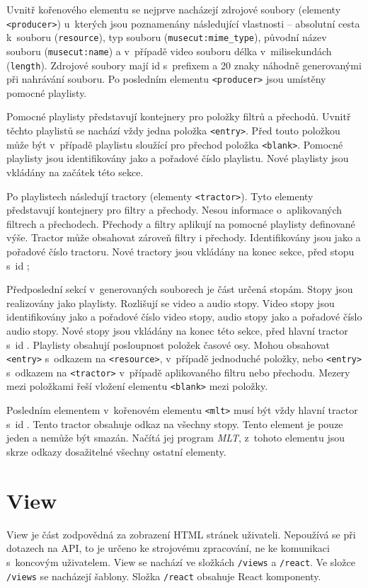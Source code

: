 Uvnitř kořenového elementu se nejprve nacházejí zdrojové soubory (elementy \texttt{<producer>}) u~kterých jsou poznamenány následující vlastnosti -- absolutní cesta k~souboru (\texttt{resource}), typ souboru (\texttt{musecut:mime\_type}), původní název souboru (\texttt{musecut:name}) a v~případě video souboru délka v~milisekundách (\texttt{length}). Zdrojové soubory mají id s~prefixem  a 20 znaky náhodně generovanými při nahrávání souboru.
Po posledním elementu \texttt{<producer>} jsou umístěny pomocné playlisty.

Pomocné playlisty představují kontejnery pro položky filtrů a přechodů. Uvnitř těchto playlistů se nachází vždy jedna položka \texttt{<entry>}. Před touto položkou může být v~případě playlistu sloužící pro přechod položka \texttt{<blank>}. Pomocné playlisty jsou identifikovány jako  a pořadové číslo playlistu. Nové playlisty jsou vkládány na začátek této sekce.

Po playlistech následují tractory (elementy \texttt{<tractor>}). Tyto elementy představují kontejnery pro filtry a přechody. Nesou informace o~aplikovaných filtrech a přechodech. Přechody a filtry aplikují na pomocné playlisty definované výše. Tractor může obsahovat zároveň filtry i přechody. Identifikovány jsou jako  a pořadové číslo tractoru. Nové tractory jsou vkládány na konec sekce, před stopu s~id ;

Předposlední sekcí v~generovaných souborech je část určená stopám. Stopy jsou realizovány jako playlisty. Rozlišují se video a audio stopy. Video stopy jsou identifikovány jako  a pořadové číslo video stopy, audio stopy jako  a pořadové číslo audio stopy. Nové stopy jsou vkládány na konec této sekce, před hlavní tractor s~id . Playlisty obsahují posloupnost položek časové osy. Mohou obsahovat \texttt{<entry>} s~odkazem na \texttt{<resource>}, v~případě jednoduché položky, nebo \texttt{<entry>} s~odkazem na \texttt{<tractor>} v~případě aplikovaného filtru nebo přechodu. Mezery mezi položkami řeší vložení elementu \texttt{<blank>} mezi položky.

Posledním elementem v~kořenovém elementu \texttt{<mlt>} musí být vždy hlavní tractor s~id . Tento tractor obsahuje odkaz na všechny stopy. Tento element je pouze jeden a nemůže být smazán. Načítá jej program \textit{MLT}, z~tohoto elementu jsou skrze odkazy dosažitelné všechny ostatní elementy.

\section{View}
View je část zodpovědná za zobrazení HTML stránek uživateli. Nepoužívá se při dotazech na API, to je určeno ke strojovému zpracování, ne ke komunikaci s~koncovým uživatelem. View se nachází ve složkách \texttt{/views} a \texttt{/react}. Ve složce \texttt{/views} se nacházejí šablony. Složka \texttt{/react} obsahuje React komponenty.

